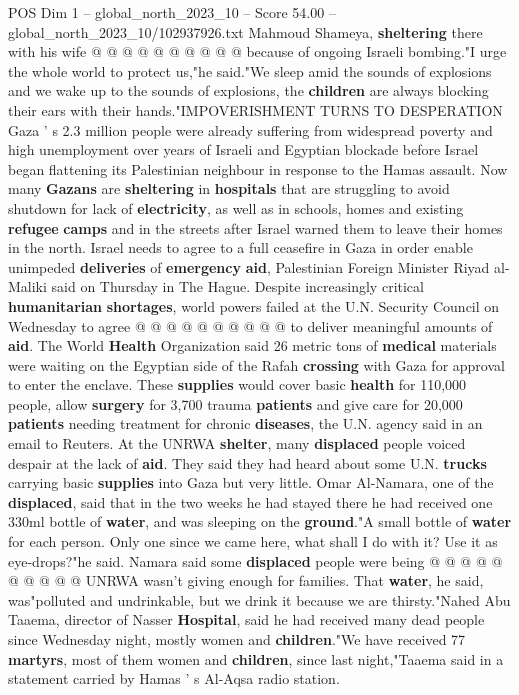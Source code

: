 \begin{textsample}{POS Dim 1 – global\_north\_2023\_10 – Score 54.00 – global\_north\_2023\_10/102937926.txt}
Mahmoud Shameya, \textbf{sheltering} there with his wife @ @ @ @ @ @ @ @ @ @ because of ongoing Israeli bombing."I urge the whole world to protect us,"he said."We sleep amid the sounds of explosions and we wake up to the sounds of explosions, the \textbf{children} are always blocking their ears with their hands."IMPOVERISHMENT TURNS TO DESPERATION Gaza ' s 2.3 million people were already suffering from widespread poverty and high unemployment over years of Israeli and Egyptian blockade before Israel began flattening its Palestinian neighbour in response to the Hamas assault.
Now many \textbf{Gazans} are \textbf{sheltering} in \textbf{hospitals} that are struggling to avoid shutdown for lack of \textbf{electricity}, as well as in schools, homes and existing \textbf{refugee} \textbf{camps} and in the streets after Israel warned them to leave their homes in the north.
Israel needs to agree to a full ceasefire in Gaza in order enable unimpeded \textbf{deliveries} of \textbf{emergency} \textbf{aid}, Palestinian Foreign Minister Riyad al-Maliki said on Thursday in The Hague.
Despite increasingly critical \textbf{humanitarian} \textbf{shortages}, world powers failed at the U.N.
Security Council on Wednesday to agree @ @ @ @ @ @ @ @ @ @ to deliver meaningful amounts of \textbf{aid}.
The World \textbf{Health} Organization said 26 metric tons of \textbf{medical} materials were waiting on the Egyptian side of the Rafah \textbf{crossing} with Gaza for approval to enter the enclave.
These \textbf{supplies} would cover basic \textbf{health} for 110,000 people, allow \textbf{surgery} for 3,700 trauma \textbf{patients} and give care for 20,000 \textbf{patients} needing treatment for chronic \textbf{diseases}, the U.N. agency said in an email to Reuters.
At the UNRWA \textbf{shelter}, many \textbf{displaced} people voiced despair at the lack of \textbf{aid}.
They said they had heard about some U.N. \textbf{trucks} carrying basic \textbf{supplies} into Gaza but very little.
Omar Al-Namara, one of the \textbf{displaced}, said that in the two weeks he had stayed there he had received one 330ml bottle of \textbf{water}, and was sleeping on the \textbf{ground}."A small bottle of \textbf{water} for each person.
Only one since we came here, what shall I do with it?
Use it as eye-drops?"he said.
Namara said some \textbf{displaced} people were being @ @ @ @ @ @ @ @ @ @ UNRWA wasn't giving enough for families.
That \textbf{water}, he said, was"polluted and undrinkable, but we drink it because we are thirsty."Nahed Abu Taaema, director of Nasser \textbf{Hospital}, said he had received many dead people since Wednesday night, mostly women and \textbf{children}."We have received 77 \textbf{martyrs}, most of them women and \textbf{children}, since last night,"Taaema said in a statement carried by Hamas ' s Al-Aqsa radio station.

\end{textsample}
